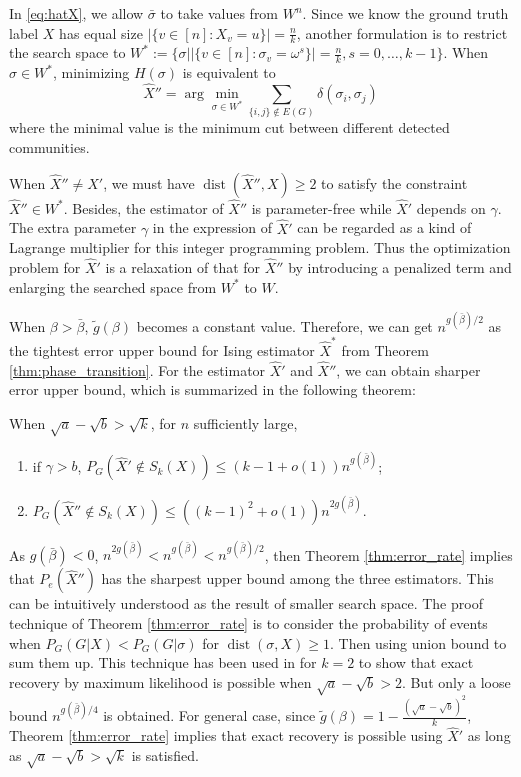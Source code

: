 \documentclass[entropy,article,submit,moreauthors,pdftex]{Definitions/mdpi}
\newcommand{\1}{\mathbbm{1}}
\DeclareMathOperator{\Dist}{dist}
\begin{document}
In \eqref{eq:hatX}, we allow $\bar{\sigma}$ to take values from $W^n$. Since we know the ground truth label $X$ has equal
size $|\{v \in [n] : X_v = u\}| = \frac{n}{k}$, another formulation is to restrict the search space to
$W^*:= \{\sigma \big\vert |\{v \in [n] : \sigma_v = \omega^s\}| = \frac{n}{k}, s=0,\dots, k-1 \}$.
When $\sigma \in W^*$, minimizing $H(\sigma)$ is equivalent to
\begin{equation}
\hat{X}'' = \arg\min_{\sigma \in W^*} \sum_{\{i,j\} \not\in E(G) } \delta(\sigma_i, \sigma_j)
\end{equation}
where the minimal value is the minimum cut between different detected communities.

When $\hat{X}'' \neq X'$, we must have $\Dist(\hat{X}'' ,X)\geq 2$ to satisfy the constraint $\hat{X}'' \in W^*$.
Besides, the estimator of $\hat{X}''$ is parameter-free while $\hat{X}'$ depends on $\gamma$. The extra parameter $\gamma$ in the expression of
$\hat{X}'$ can be regarded as a kind of Lagrange multiplier for this integer programming problem. Thus the optimization problem for $\hat{X}'$
is a relaxation of that for $\hat{X}''$ by introducing a penalized term and enlarging the searched space from $W^*$ to $W$.

When $\beta > \bar{\beta}$, $\tilde{g}(\beta)$ becomes a constant value. Therefore, we can get $n^{g(\bar{\beta})/2}$ as the tightest error upper bound for Ising estimator $\hat{X}^*$ from Theorem \ref{thm:phase_transition}.
For the estimator $\hat{X}'$ and $\hat{X}''$, we can obtain sharper error upper bound, which is
summarized in the following theorem:
\begin{Theorem}\label{thm:error_rate}
When $\sqrt{a} - \sqrt{b} > \sqrt{k}$, for $n$ sufficiently large, 
\begin{enumerate}
	\item if $\gamma > b$, $P_G(\hat{X}' \not\in S_k(X)) \leq (k-1+o(1))n^{g(\bar{\beta})}$;
	\item $P_G(\hat{X}'' \not\in S_k(X)) \leq ((k-1)^2+o(1))n^{2g(\bar{\beta})}$.
\end{enumerate}
\end{Theorem}
As $g(\bar{\beta})<0$, $n^{2g(\bar{\beta})} < n^{g(\bar{\beta})} < n^{g(\bar{\beta})/2}$, then
Theorem \ref{thm:error_rate} implies that $P_e(\hat{X}'')$ has the sharpest upper bound among the three estimators.
This can be intuitively understood as the result of smaller search space.
The proof technique of Theorem \ref{thm:error_rate} is to consider the probability of events when $P_G(G | X) < P_G(G | \sigma)$
for $\Dist(\sigma, X) \geq 1$. Then using union bound to sum them up.
This technique has been used in \cite{abbe2015exact} for $k=2$ to show that exact recovery by maximum likelihood is possible
when $\sqrt{a} - \sqrt{b} > 2$. But only a loose bound $n^{g(\bar{\beta})/4}$ is obtained.
For general case, since $\tilde{g}(\beta) = 1- \frac{(\sqrt{a} - \sqrt{b})^2}{k}$, Theorem \ref{thm:error_rate} implies that exact recovery is possible using $\hat{X}'$ as long as  
$\sqrt{a} - \sqrt{b} > \sqrt{k}$ is satisfied.
\end{document}
